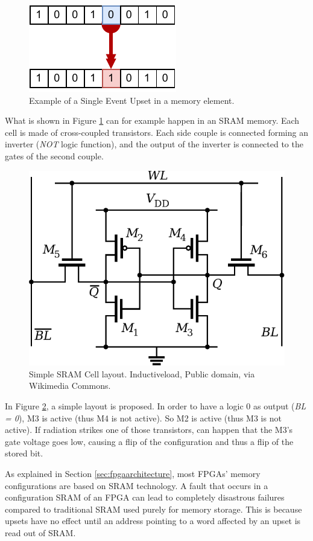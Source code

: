 \begin{figure}[H]
\centering
\includegraphics[height=0.20\linewidth]{images/chapter2/SEU_EXAMPLE.pdf}
\caption{Example of a Single Event Upset in a memory element.}
\label{fig:seu_example}
\end{figure}

What is shown in Figure \ref{fig:seu_example} can for example happen in an SRAM memory. Each cell is made of cross-coupled transistors. Each side couple is connected forming an inverter (\textit{NOT} logic function), and the output of the inverter is connected to the gates of the second couple.  

\begin{figure}[H]
\centering
\includegraphics[height=0.55\linewidth]{images/chapter2/SRAM_CELL.pdf}
\caption{Simple SRAM Cell layout. Inductiveload, Public domain, via Wikimedia Commons.}
\label{fig:sram_cell_layout}
\end{figure}

In Figure \ref{fig:sram_cell_layout}, a simple layout is proposed. In order to have a logic 0 as output (\textit{BL = 0}), M3 is active (thus M4 is not active). So M2 is active (thus M3 is not active). If radiation strikes one of those transistors, can happen that the M3's gate voltage goes low, causing a flip of the configuration and thus a flip of the stored bit. \bigskip

As explained in Section \ref{sec:fpgaarchitecture}, most FPGAs' memory configurations are based on SRAM technology. A fault that occurs in a configuration SRAM of an FPGA can lead to completely disastrous failures compared to traditional SRAM used purely for memory storage. This is because upsets have no effect until an address pointing to a word affected by an upset is read out of SRAM. \bigskip

